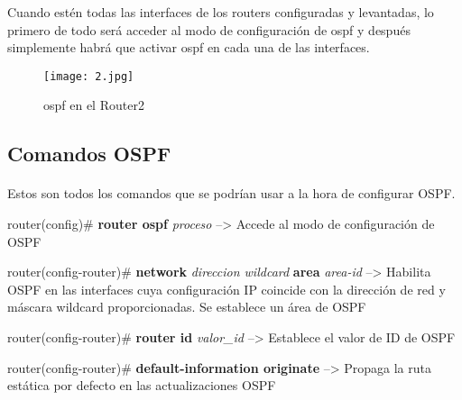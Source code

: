 \documentclass[a4paper,11pt]{article}
\begin{document}
Cuando estén todas las interfaces de los routers configuradas y levantadas, lo primero de todo será acceder al modo de configuración de ospf y después simplemente habrá que activar ospf en cada una de las interfaces.

\begin{figure}[ht!]
  \begin{center}
    \texttt{[image: 2.jpg]}
    \label{fig:}
    \caption{ospf en el Router2}
  \end{center}
\end{figure}


\subsection{Comandos OSPF}
\paragraph{  }
Estos son todos los comandos que se podrían usar a la hora de configurar OSPF.

router(config)\# \textbf{router ospf} \textit{proceso} --> Accede al modo de configuración de OSPF

router(config-router)\# \textbf{network} \textit{direccion wildcard} \textbf{area} \textit{area-id} --> Habilita OSPF en las interfaces cuya configuración IP coincide con la dirección de red y máscara wildcard proporcionadas. Se establece un área de OSPF


router(config-router)\# \textbf{router id} \textit{valor\_id} --> Establece el valor de ID de OSPF

router(config-router)\# \textbf{default-information originate} --> Propaga la ruta estática por defecto en las actualizaciones OSPF




%
\end{document}
